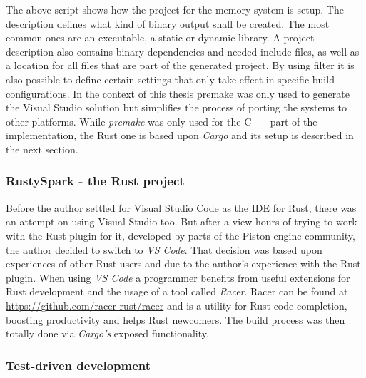 \noindent
The above script shows how the project for the memory system is setup. The description defines what kind of binary output shall be created. The most common ones are an executable, a static or dynamic library. A project description also contains binary dependencies and needed include files, as well as a location for all files that are part of the generated project. By using filter it is also possible to define certain settings that only take effect in specific build configurations. In the context of this thesis premake was only used to generate the Visual Studio solution but simplifies the process of porting the systems to other platforms. While \textit{premake} was only used for the C++ part of the implementation, the Rust one is based upon \textit{Cargo} and its setup is described in the next section.

\subsubsection{RustySpark - the Rust project}

Before the author settled for Visual Studio Code as the \ac{IDE} for Rust, there was an attempt on using Visual Studio too. But after a view hours of trying to work with the Rust plugin for it, developed by parts of the Piston engine community, the author decided to switch to \textit{VS Code}. That decision was based upon experiences of other Rust users and due to the author's experience with the Rust plugin. When using \textit{VS Code} a programmer benefits from useful extensions for Rust development and the usage of a tool called \textit{Racer}. Racer can be found at \url{https://github.com/racer-rust/racer} and is a utility for Rust code completion, boosting productivity and helps Rust newcomers. The build process was then totally done via \textit{Cargo's} exposed functionality. 

\subsubsection{Test-driven development} \label{tdd}

